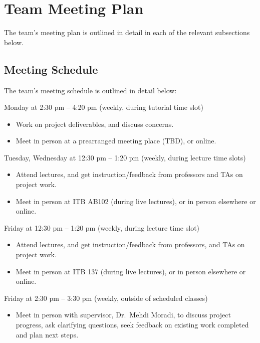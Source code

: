 \documentclass{article}
\begin{document}
\section{Team Meeting Plan}

The team's meeting plan is outlined in detail in each of the relevant subsections below.

\subsection{Meeting Schedule}

The team's meeting schedule is outlined in detail below:

\begin{itemize}
\begin{item}
Monday at 2:30 pm – 4:20 pm (weekly, during tutorial time slot)
\begin{itemize}
\item Work on project deliverables, and discuss concerns.
\item Meet in person at a prearranged meeting place (TBD), or online.
\end{itemize}
\end{item}
\begin{item}
Tuesday, Wednesday at 12:30 pm – 1:20 pm (weekly, during lecture time slots)
\begin{itemize}
\item Attend lectures, and get instruction/feedback from professors and TAs on project work.
\item Meet in person at ITB AB102 (during live lectures), or in person elsewhere or online.
\end{itemize}
\end{item}
\begin{item}
Friday at 12:30 pm – 1:20 pm (weekly, during lecture time slot)
\begin{itemize}
\item Attend lectures, and get instruction/feedback from professors, and TAs on project work.
\item Meet in person at ITB 137 (during live lectures), or in person elsewhere or online.
\end{itemize}
\end{item}
\begin{item}
Friday at 2:30 pm – 3:30 pm (weekly, outside of scheduled classes)
\begin{itemize}
\item Meet in person with supervisor, Dr.~Mehdi Moradi, to discuss project progress, ask clarifying questions, seek feedback on existing work completed and plan next steps.
\end{itemize}
\end{item}
\end{itemize}
\end{document}

